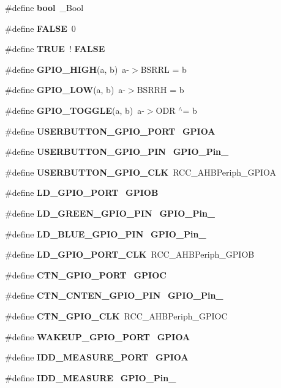 \begin{DoxyCompactItemize}
\item 
\#define \textbf{ bool}~\+\_\+\+Bool
\item 
\#define \textbf{ F\+A\+L\+SE}~0
\item 
\#define \textbf{ T\+R\+UE}~!\textbf{ F\+A\+L\+SE}
\item 
\#define \textbf{ G\+P\+I\+O\+\_\+\+H\+I\+GH}(a,  b)~a-\/$>$B\+S\+R\+RL = b
\item 
\#define \textbf{ G\+P\+I\+O\+\_\+\+L\+OW}(a,  b)~a-\/$>$B\+S\+R\+RH = b
\item 
\#define \textbf{ G\+P\+I\+O\+\_\+\+T\+O\+G\+G\+LE}(a,  b)~a-\/$>$O\+DR $^\wedge$= b
\item 
\#define \textbf{ U\+S\+E\+R\+B\+U\+T\+T\+O\+N\+\_\+\+G\+P\+I\+O\+\_\+\+P\+O\+RT}~\textbf{ G\+P\+I\+OA}
\item 
\#define \textbf{ U\+S\+E\+R\+B\+U\+T\+T\+O\+N\+\_\+\+G\+P\+I\+O\+\_\+\+P\+IN}~\textbf{ G\+P\+I\+O\+\_\+\+Pin\+\_}
\item 
\#define \textbf{ U\+S\+E\+R\+B\+U\+T\+T\+O\+N\+\_\+\+G\+P\+I\+O\+\_\+\+C\+LK}~R\+C\+C\+\_\+\+A\+H\+B\+Periph\+\_\+\+G\+P\+I\+OA
\item 
\#define \textbf{ L\+D\+\_\+\+G\+P\+I\+O\+\_\+\+P\+O\+RT}~\textbf{ G\+P\+I\+OB}
\item 
\#define \textbf{ L\+D\+\_\+\+G\+R\+E\+E\+N\+\_\+\+G\+P\+I\+O\+\_\+\+P\+IN}~\textbf{ G\+P\+I\+O\+\_\+\+Pin\+\_}
\item 
\#define \textbf{ L\+D\+\_\+\+B\+L\+U\+E\+\_\+\+G\+P\+I\+O\+\_\+\+P\+IN}~\textbf{ G\+P\+I\+O\+\_\+\+Pin\+\_}
\item 
\#define \textbf{ L\+D\+\_\+\+G\+P\+I\+O\+\_\+\+P\+O\+R\+T\+\_\+\+C\+LK}~R\+C\+C\+\_\+\+A\+H\+B\+Periph\+\_\+\+G\+P\+I\+OB
\item 
\#define \textbf{ C\+T\+N\+\_\+\+G\+P\+I\+O\+\_\+\+P\+O\+RT}~\textbf{ G\+P\+I\+OC}
\item 
\#define \textbf{ C\+T\+N\+\_\+\+C\+N\+T\+E\+N\+\_\+\+G\+P\+I\+O\+\_\+\+P\+IN}~\textbf{ G\+P\+I\+O\+\_\+\+Pin\+\_}
\item 
\#define \textbf{ C\+T\+N\+\_\+\+G\+P\+I\+O\+\_\+\+C\+LK}~R\+C\+C\+\_\+\+A\+H\+B\+Periph\+\_\+\+G\+P\+I\+OC
\item 
\#define \textbf{ W\+A\+K\+E\+U\+P\+\_\+\+G\+P\+I\+O\+\_\+\+P\+O\+RT}~\textbf{ G\+P\+I\+OA}
\item 
\#define \textbf{ I\+D\+D\+\_\+\+M\+E\+A\+S\+U\+R\+E\+\_\+\+P\+O\+RT}~\textbf{ G\+P\+I\+OA}
\item 
\#define \textbf{ I\+D\+D\+\_\+\+M\+E\+A\+S\+U\+RE}~\textbf{ G\+P\+I\+O\+\_\+\+Pin\+\_}
\end{DoxyCompactItemize}


